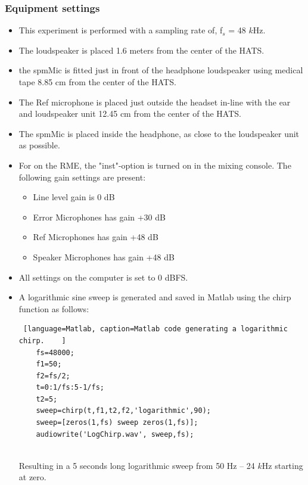\subsubsection{Equipment settings}\label{sec:SettingsAngInc}
\begin{itemize}
	\item This experiment is performed with a sampling rate of, f$_{s}$ = 48 $k$Hz.
	\item The loudspeaker is placed 1.6 meters from the center of the HATS.
	\item the spmMic is fitted just in front of the headphone loudspeaker using medical tape 8.85 cm from the center of the HATS.
	\item The Ref microphone is placed just outside the headset in-line with the ear and loudspeaker unit 12.45 cm from the center of the HATS. 
	\item The spmMic is placed inside the headphone, as close to the loudspeaker unit as possible. 
	\item For on the RME, the "inst"-option is turned on in the mixing console. The following gain settings are present: 		
	\begin{itemize}
		\item Line level gain is 0 dB
		\item Error Microphones has gain +30 dB
		\item Ref Microphones has gain +48 dB
		\item Speaker Microphones has gain +48 dB
	\end{itemize}
	\item All settings on the computer is set to 0 dBFS.
	\item A logarithmic sine sweep is generated and saved in Matlab using the chirp function as follows:
	\begin{lstlisting} [language=Matlab, caption=Matlab code generating a logarithmic chirp.	]
	fs=48000;
	f1=50;
	f2=fs/2;
	t=0:1/fs:5-1/fs;
	t2=5;
	sweep=chirp(t,f1,t2,f2,'logarithmic',90);
	sweep=[zeros(1,fs) sweep zeros(1,fs)];
	audiowrite('LogChirp.wav', sweep,fs);
	
	\end{lstlisting}
	Resulting in a 5 seconds long logarithmic sweep from 50 Hz -- 24 $k$Hz starting at zero.
\end{itemize} 
 
